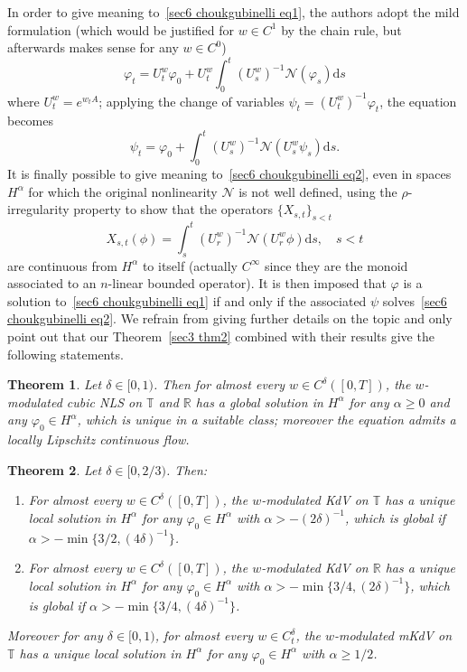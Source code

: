 \documentclass[10pt]{article}
\newcommand{\mathd}{\mathrm{d}}
\newtheorem{theorem}{Theorem}%
\begin{document}
In order to give meaning to~\eqref{sec6 choukgubinelli eq1}, the authors adopt
the mild formulation (which would be justified for $w \in C^1$ by the chain
rule, but afterwards makes sense for any $w \in C^0$)
\[ \varphi_t = U^w_t \varphi_0 + U^w_t \int_0^t (U^w_s)^{- 1} \mathcal{N}
   (\varphi_s) \mathd s \]
where $U^w_t = e^{w_t A}$; applying the change of variables $\psi_t =
(U^w_t)^{- 1} \varphi_t$, the equation becomes
\begin{equation}
  \psi_t = \varphi_0 + \int_0^t (U^w_s)^{- 1} \mathcal{N} (U^w_s \psi_s)
  \mathd s \label{sec6 choukgubinelli eq2} .
\end{equation}
It is finally possible to give meaning to~\eqref{sec6 choukgubinelli eq2},
even in spaces $H^{\alpha}$ for which the original nonlinearity $\mathcal{N}$
is not well defined, using the $\rho$\mbox{-}irregularity property to show
that the operators $\{ X_{s, t} \}_{s < t}$
\[ X_{s, t} (\phi) = \int_s^t (U^w_r)^{- 1} \mathcal{N} (U^w_r \phi) \mathd s,
   \quad s < t \]
are continuous from $H^{\alpha}$ to itself (actually $C^{\infty}$ since they
are the monoid associated to an $n$\mbox{-}linear bounded operator). It is
then imposed that $\varphi$ is a solution to~\eqref{sec6 choukgubinelli eq1}
if and only if the associated $\psi$ solves~\eqref{sec6 choukgubinelli eq2}.
We refrain from giving further details on the topic and only point out that
our Theorem~\ref{sec3 thm2} combined with their results give the following
statements.

\begin{theorem}
  \label{sec6 thm nls}Let $\delta \in [0, 1)$. Then for almost every $w \in
  C^{\delta} ([0, T])$, the $w$\mbox{-}modulated cubic NLS on $\mathbb{T}$ and
  $\mathbb{R}$ has a global solution in $H^{\alpha}$ for any $\alpha \geqslant
  0$ and any $\varphi_0 \in H^{\alpha}$, which is unique in a suitable class;
  moreover the equation admits a locally Lipschitz continuous flow.
\end{theorem}

\begin{theorem}
  \label{sec6 thm kdv}Let $\delta \in [0, 2 / 3)$. Then:
  \begin{enumerate}[label=\roman*.]
    \item For almost every $w \in C^{\delta} ([0, T])$, the
    $w$\mbox{-}modulated KdV on $\mathbb{T}$ has a unique local solution in
    $H^{\alpha}$ for any $\varphi_0 \in H^{\alpha}$ with $\alpha > - (2
    \delta)^{- 1}$, which is global if $\alpha > - \min \{ 3 / 2, (4
    \delta)^{- 1} \}$.
    
    \item For almost every $w \in C^{\delta} ([0, T])$, the
    $w$\mbox{-}modulated KdV on $\mathbb{R}$ has a unique local solution in
    $H^{\alpha}$ for any $\varphi_0 \in H^{\alpha}$ with $\alpha > - \min \{ 3
    / 4, (2 \delta)^{- 1} \}$, which is global if $\alpha > - \min \{ 3 / 4, (4
    \delta)^{- 1} \}$.
  \end{enumerate}
  Moreover for any $\delta \in [0, 1)$, for almost every $w \in C^{\delta}_t$,
  the $w$\mbox{-}modulated mKdV on $\mathbb{T}$ has a unique local solution in
  $H^{\alpha}$ for any $\varphi_0 \in H^{\alpha}$ with $\alpha \geqslant 1 /
  2$.
\end{theorem}
\end{document}
